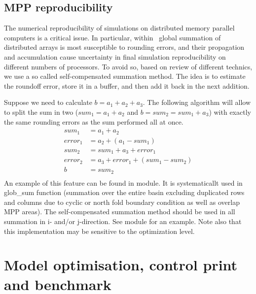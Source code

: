 \documentclass[../main/NEMO_manual]{subfiles}
\begin{document}
\subsection{MPP reproducibility}
\label{subsec:MISC_glosum}

The numerical reproducibility of simulations on distributed memory parallel computers is a critical issue.
In particular, within \NEMO\ global summation of distributed arrays is most susceptible to rounding errors,
and their propagation and accumulation cause uncertainty in final simulation reproducibility on
different numbers of processors.
To avoid so, based on \citet{he.ding_JS01} review of different technics,
we use a so called self-compensated summation method.
The idea is to estimate the roundoff error, store it in a buffer, and then add it back in the next addition.

Suppose we need to calculate $b = a_1 + a_2 + a_3$.
The following algorithm will allow to split the sum in two
($sum_1 = a_{1} + a_{2}$ and $b = sum_2 = sum_1 + a_3$) with exactly the same rounding errors as
the sum performed all at once.
\begin{align*}
	sum_1 \ \  &= a_1 + a_2 \\
	error_1     &= a_2 + ( a_1 - sum_1 ) \\
	sum_2 \ \  &= sum_1 + a_3 + error_1 \\
	error_2     &= a_3 + error_1 + ( sum_1 - sum_2 ) \\
	b \qquad \ &= sum_2 \\
\end{align*}
An example of this feature can be found in  module.
It is systematicallt used in glob\_sum function (summation over the entire basin excluding duplicated rows and
columns due to cyclic or north fold boundary condition as well as overlap MPP areas).
The self-compensated summation method should be used in all summation in i- and/or j-direction.
See  module for an example.
Note also that this implementation may be sensitive to the optimization level.

\section{Model optimisation, control print and benchmark}
\label{sec:MISC_opt}
\end{document}
